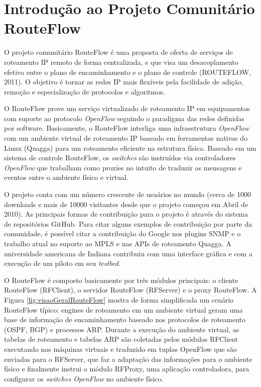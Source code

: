 \section{Introdução ao Projeto Comunitário RouteFlow}

O projeto comunitário RouteFlow é uma proposta de oferta de serviços de
roteamento IP remoto de forma centralizada, e que visa um
desacoplamento efetivo entre o plano de encaminhamento e o
plano de controle (ROUTEFLOW, 2011). O objetivo é tornar as
redes IP mais flexíveis pela facilidade de adição,
remoção e especialização de protocolos e algoritmos.


O RouteFlow prove um serviço virtualizado de roteamento IP
em equipamentos com suporte ao protocolo \textit{OpenFlow}
seguindo o paradigma das redes definidas por software.
Basicamente, o RouteFlow interliga uma infraestrutura 
\textit{OpenFlow} com um ambiente virtual de roteamento 
IP baseado em ferramentas nativas do Linux (Quagga) para
um roteamento eficiente na estrutura física. Baseado em um
sistema de controle RouteFlow, os \textit{switches} 
são instruídos via controladores \textit{OpenFlow} que 
trabalham como proxies no intuito de traduzir as mensagens
e eventos entre o ambiente físico e virtual. 

O projeto conta com um número crescente de usuários no 
mundo (cerca de 1000 downloads e mais de 10000 visitantes
desde que o projeto começou em Abril de 2010). As principais
formas de contribuição para o projeto é através do sistema
de repositórios GitHub. Para citar alguns exemplos de contribuição
por parte da comunidade, é possível citar a contribuição
do Google nos plugins SNMP e o trabalho atual no suporte
ao MPLS e nas APIs de roteamento Quagga. A universidade
americana de Indiana contribuiu com uma interface gráfica
e com a execução de um piloto em seu \textit{testbed}.


O RouteFlow é composto basicamente por três módulos principais:
o cliente RouteFlow (RFClient), o servidor RouteFlow (RFServer) e
o proxy RouteFlow. A Figura \ref{fig:visaoGeralRouteFlow} mostra
de forma simplificada um cenário RouteFlow típico: engines de 
roteamento em um ambiente virtual geram uma base de 
informação de encaminhamento baseado nos protocolos 
de roteamento (OSPF, BGP) e processos ARP. Durante a 
execução do ambiente virtual, as tabelas de roteamento e 
tabelas ARP são coletadas pelos módulos RFClient executando
nas máquinas virtuais e traduzido em tuplas OpenFlow que
são enviadas para o RFServer, que faz a adaptação das 
informações para o ambiente físico e finalmente instrui o 
módulo RFProxy, uma aplicação controladora, para configurar
os \textit{switches OpenFlow} no ambiente físico.

